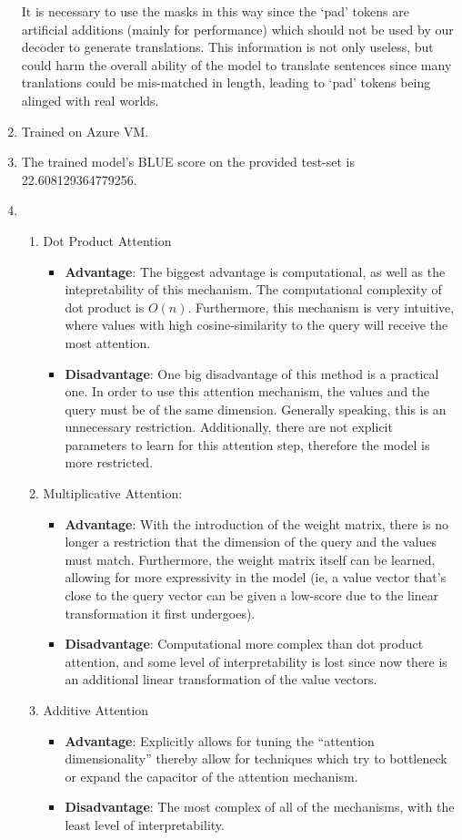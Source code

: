 \documentclass[12pt]{article}
\begin{document}
\begin{enumerate}[label=(\alph*)]
    It is necessary to use the masks in this way since the `pad' tokens are artificial additions (mainly for performance) which should not be used by our decoder to generate translations. This information is not only useless, but could harm the overall ability of the model to translate sentences since many tranlations could be mis-matched in length, leading to `pad' tokens being alinged with real worlds.
  \item
    Trained on Azure VM.
  \item The trained model's BLUE score on the provided test-set is 22.608129364779256.
  \item
    \begin{enumerate}[label=\roman*]
      \item Dot Product Attention
        \begin{itemize}
          \item \textbf{Advantage}: The biggest advantage is computational, as well as the intepretability of this mechanism. The computational complexity of dot product is $O(n)$. Furthermore, this mechanism is very intuitive, where values with high cosine-similarity to the query will receive the most attention.
          \item \textbf{Disadvantage}: One big disadvantage of this method is a practical one. In order to use this attention mechanism, the values and the query must be of the same dimension. Generally speaking, this is an unnecessary restriction. Additionally, there are not explicit parameters to learn for this attention step, therefore the model is more restricted.
        \end{itemize}
      \item Multiplicative Attention:
        \begin{itemize}
          \item \textbf{Advantage}: With the introduction of the weight matrix, there is no longer a restriction that the dimension of the query and the values must match. Furthermore, the weight matrix itself can be learned, allowing for more expressivity in the model (ie, a value vector that's close to the query vector can be given a low-score due to the linear transformation it first undergoes).
          \item \textbf{Disadvantage}: Computational more complex than dot product attention, and some level of interpretability is lost since now there is an additional linear transformation of the value vectors.
        \end{itemize}
      \item Additive Attention
        \begin{itemize}
          \item \textbf{Advantage}: Explicitly allows for tuning the ``attention dimensionality'' thereby allow for techniques which try to bottleneck or expand the capacitor of the attention mechanism.
          \item \textbf{Disadvantage}: The most complex of all of the mechanisms, with the least level of interpretability.
        \end{itemize}
    \end{enumerate}
\end{enumerate}
\end{document}

